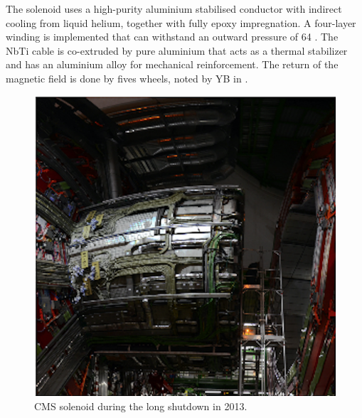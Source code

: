 	The solenoid uses a high-purity aluminium stabilised conductor with indirect cooling from liquid helium, together with fully epoxy impregnation. A four-layer winding is implemented that can withstand an outward pressure of 64 \si{ \atm}. The NbTi cable is co-extruded by pure aluminium that acts as a thermal stabilizer and has an aluminium alloy for mechanical reinforcement. The return of the magnetic field is done by fives wheels, noted by YB in .
	
	\begin{figure}[htbp]
		\centering
		\includegraphics[width=1.\textwidth]{2_ExperimentalSetup/Figures/solenoid}
		\caption{CMS solenoid during the long shutdown in 2013. }
		\label{fig:CMSsolenoid}
	\end{figure}	
	
